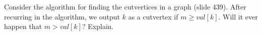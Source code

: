 Consider the algorithm for finding the cutvertices in a graph (slide 439).
After recurring in the algorithm, we output $k$ as a cutvertex if 
$m \geq  val[k]$.  Will it ever happen that $m > val[k]$?  Explain.
